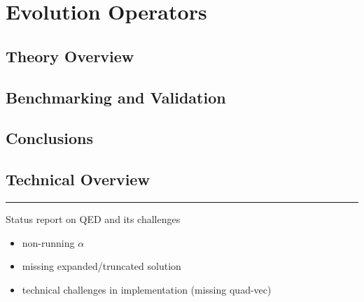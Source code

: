 
\chapter{Evolution Operators}
\label{ch:eko}
\minitoc
\adjustmtc



\section{Theory Overview}
\label{sec:eko/theory}


\section{Benchmarking and Validation}
\label{sec:eko/pheno}


\section{Conclusions}
\label{sec:eko/concl}


\section{Technical Overview}
\label{sec:eko/code}


\vspace*{20pt}
\noindent
\rule{\hsize}{1pt}

Status report on QED and its challenges

\begin{itemize}
	\item non-running $\alpha$
	\item missing expanded/truncated solution
	\item technical challenges in implementation (missing quad-vec)
\end{itemize}
